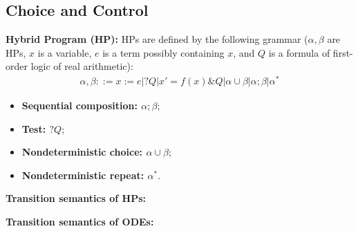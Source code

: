\subsection{Choice and Control}

\textbf{Hybrid Program (HP):} HPs are defined by the following grammar 
($\alpha, \beta$ are HPs, $x$ is a variable, $e$ is a term possibly 
containing $x$, and $Q$ is a formula of first-order logic of 
real arithmetic):
\begin{align*}
  \alpha, \beta ::= x := e | ?Q | x' = f(x) \& Q | \alpha \cup \beta 
    | \alpha ; \beta | \alpha^*
\end{align*}
\vspace{-.5cm}
\begin{itemize}
  \item \textbf{Sequential composition: $\alpha ; \beta$};
  \item \textbf{Test: $?Q$};
  \item \textbf{Nondeterministic choice: $\alpha \cup \beta$};
  \item \textbf{Nondeterministic repeat: $\alpha^*$}.
\end{itemize}

\textbf{Transition semantics of HPs:}

\textbf{Transition semantics of ODEs:}

\crule

